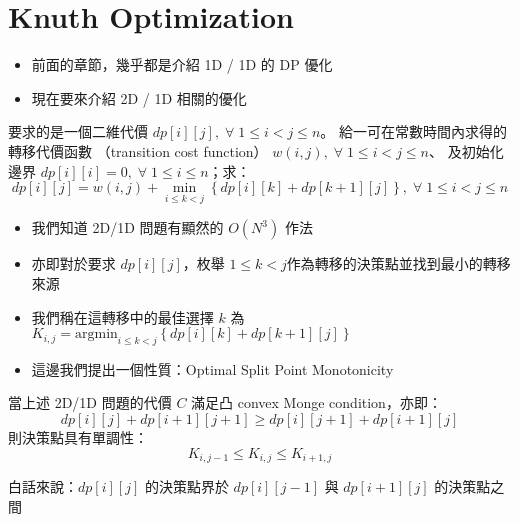 \documentclass[standalone]{beamer}
\begin{document}
\section{Knuth Optimization}

\begin{frame}{}
  \begin{itemize}
    \item 前面的章節，幾乎都是介紹 1D / 1D 的 DP 優化
    \item 現在要來介紹 2D / 1D 相關的優化
  \end{itemize}
\end{frame}

\begin{frame}{}
  \begin{theorem}[(2D/1D)]
  要求的是一個二維代價 $dp[i][j], \;\forall\; 1\leq i< j\leq n$。
  給一可在常數時間內求得的轉移代價函數 （transition cost function） $w(i,j), \;\forall\; 1\leq i<j\leq n$、
  及初始化邊界 $dp[i][i]=0, \;\forall\; 1\leq i \leq n$；求：
  \[ dp[i][j] = w(i,j) + \min_{i\leq k<j}\left\{dp[i][k]+dp[k+1][j]\right\}, \;\forall\; 1\leq i<j\leq n \]
  \end{theorem}
\end{frame}

\begin{frame}{}
  \begin{itemize}
    \item 我們知道 2D/1D 問題有顯然的 $O(N^3)$ 作法
    \item 亦即對於要求 $dp[i][j]$，枚舉 $1\leq k <j$作為轉移的決策點並找到最小的轉移來源
    \item 我們稱在這轉移中的最佳選擇 $k$ 為 $K_{i,j} = \mathrm{argmin}_{i\leq k<j}\left\{dp[i][k]+dp[k+1][j]\right\}$
    \item 這邊我們提出一個性質：Optimal Split Point Monotonicity
  \end{itemize}
\end{frame}

\begin{frame}{}
  \begin{theorem}
  當上述 2D/1D 問題的代價 $C$ 滿足凸 convex Monge condition，亦即：
  $$ dp[i][j]+dp[i+1][j+1] \geq dp[i][j+1]+dp[i+1][j]$$
  則決策點具有單調性：
  $$ K_{i,j-1} \leq K_{i,j} \leq K_{i+1,j} $$
  \end{theorem}

  白話來說：$dp[i][j]$ 的決策點界於 $dp[i][j-1]$ 與 $dp[i+1][j]$ 的決策點之間
\end{frame}
\end{document}
